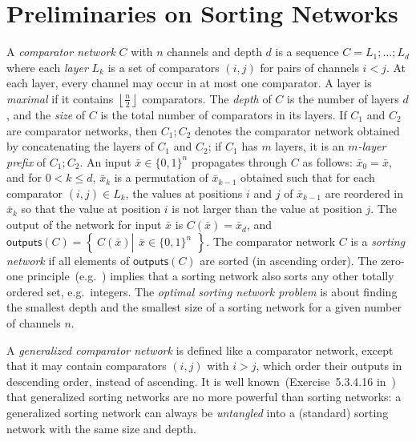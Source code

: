 \documentclass[10pt]{IEEEtran}
\newcommand{\outputs}{\mathsf{outputs}}
\newcommand{\sset}[2]{\left\{~#1  \left|
      \begin{array}{l}#2\end{array}
    \right.     \right\}}
\begin{document}
\section{Preliminaries on Sorting Networks}
\label{sec:prelim}

A \emph{comparator network} $C$ with $n$ channels and depth $d$ is a
sequence $C = L_1;\ldots;L_d$ where each \emph{layer} $L_k$ is
a set of comparators $(i,j)$ for pairs of channels $i < j$. At each
layer, every channel may occur in at most one comparator.  A layer
is \emph{maximal} if it contains $\left\lfloor\frac n2\right\rfloor$
comparators.  The \emph{depth} of $C$ is the number of layers $d$, and
the \emph{size} of $C$ is the total number of comparators in its
layers. If $C_1$ and $C_2$ are comparator networks, then $C_1;C_2$
denotes the comparator network obtained by concatenating the layers of
$C_1$ and $C_2$; if $C_1$ has $m$ layers, it is an \emph{$m$-layer
  prefix} of $C_1;C_2$.
An input $\bar x\in\{0,1\}^n$ propagates through $C$ as follows:
$\bar x_0 = \bar x$, and for $0<k\leq d$, $\bar x_k$ is a permutation
of $\bar x_{k-1}$ obtained such that for each comparator $(i,j)\in
L_k$, the values at positions $i$ and $j$ of $\bar x_{k-1}$ are
reordered in $\bar x_k$ so that the value at position $i$ is not
larger than the value at position $j$. The output of the network for
input $\bar x$ is $C(\bar x)=\bar x_d$, and
$\outputs(C)=\sset{C(\bar x)}{\bar x\in\{0,1\}^n}$.  The
comparator network $C$ is a \emph{sorting network} if all elements of
$\outputs(C)$ are sorted (in ascending order).
The zero-one principle~(e.g.~\cite{Knuth73}) implies that a sorting
network also sorts any other totally ordered set, e.g.~integers.
The \emph{optimal sorting network problem} is about finding the smallest
depth and the smallest size of a sorting network for a given number of
channels $n$.

A \emph{generalized comparator network} is defined like a comparator network,
except that it may contain comparators $(i,j)$ with $i>j$, which
order their outputs in descending order, instead of ascending.
It is well known~(Exercise~5.3.4.16 in~\cite{Knuth73}) that generalized sorting
networks are no more powerful than sorting networks: a generalized
sorting network can always be \emph{untangled} into a (standard) sorting
network with the same size and depth.
\end{document}
